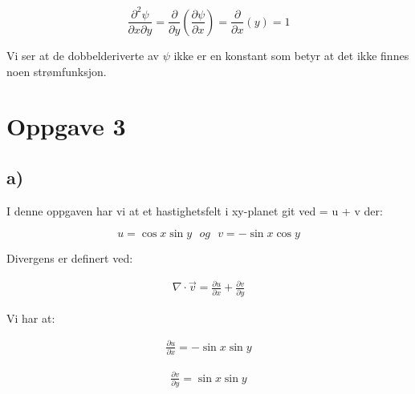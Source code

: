 \documentclass{article}
\begin{document}
\begin{flushle}
\begin{equation*}
\frac{\partial^2\psi}{\partial x \partial y} = \frac{\partial}{\partial y}(\frac{\partial \psi}{\partial x}) = \frac{\partial}{\partial x}(y) = 1
\end{equation*}

\begin{flushleft}
Vi ser at de dobbelderiverte av \(\psi\) ikke er en konstant som betyr at det ikke finnes noen strømfunksjon.
\end{flushleft}


%
%

\section*{Oppgave 3}

%
%

\subsection*{a)}

\begin{flushleft}
I denne oppgaven har vi at et hastighetsfelt i xy-planet git ved  = u + v der:
\end{flushleft}

\begin{equation*}
u = \cos{x}\sin{y} \ \ \ og \ \ \ v = -\sin{x}\cos{y}
\end{equation*}

\bigskip

\begin{flushleft}
Divergens er definert ved:
\end{flushleft}

\begin{align*}
\nabla \cdot \vec{v} = \frac{\partial u}{\partial x} + \frac{\partial v}{\partial y}
\end{align*}

\begin{flushleft}
Vi har at:
\end{flushleft}
\begin{multicols}{2}
\begin{align*}
\frac{\partial u}{\partial x} = -\sin{x}\sin{y}
\end{align*}

\begin{align*}
\frac{\partial v}{\partial y} = \sin{x}\sin{y}
\end{align*}
\end{multicols}


\end{flushle}
\end{document}
